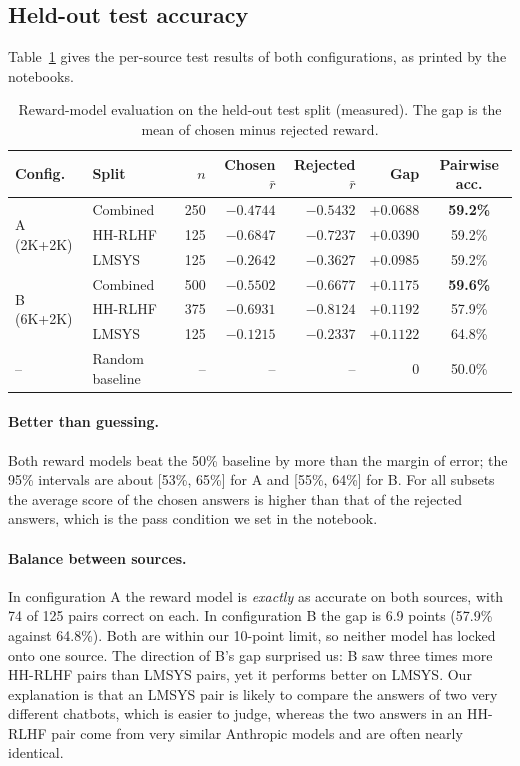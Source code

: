 \subsection{Held-out test accuracy}
Table~\ref{tab:rm-results} gives the per-source test results of both configurations, as printed by the notebooks.

\begin{table}[!htbp]
\centering
\caption[Reward-model test results (A and B)]{Reward-model evaluation on the held-out test split (measured). The gap is the mean of chosen minus rejected reward.}
\label{tab:rm-results}
\small\setlength{\tabcolsep}{4.5pt}
\begin{tabular}{@{}llrrrrc@{}}
\toprule
\textbf{Config.} & \textbf{Split} & \textbf{$n$} & \textbf{Chosen $\bar r$} & \textbf{Rejected $\bar r$} & \textbf{Gap} & \textbf{Pairwise acc.}\\
\midrule
\multirow{3}{*}{A (2K+2K)} & Combined & 250 & $-0.4744$ & $-0.5432$ & $+0.0688$ & \textbf{59.2\%}\\
 & HH-RLHF & 125 & $-0.6847$ & $-0.7237$ & $+0.0390$ & 59.2\%\\
 & LMSYS & 125 & $-0.2642$ & $-0.3627$ & $+0.0985$ & 59.2\%\\
\midrule
\multirow{3}{*}{B (6K+2K)} & Combined & 500 & $-0.5502$ & $-0.6677$ & $+0.1175$ & \textbf{59.6\%}\\
 & HH-RLHF & 375 & $-0.6931$ & $-0.8124$ & $+0.1192$ & 57.9\%\\
 & LMSYS & 125 & $-0.1215$ & $-0.2337$ & $+0.1122$ & 64.8\%\\
\midrule
-- & Random baseline & -- & -- & -- & 0 & 50.0\%\\
\bottomrule
\end{tabular}
\end{table}

\paragraph{Better than guessing.} Both reward models beat the 50\% baseline by more than the margin of error; the 95\% intervals are about [53\%, 65\%] for A and [55\%, 64\%] for B. For all subsets the average score of the chosen answers is higher than that of the rejected answers, which is the pass condition we set in the notebook.

\paragraph{Balance between sources.} In configuration A the reward model is \emph{exactly} as accurate on both sources, with 74 of 125 pairs correct on each. In configuration B the gap is 6.9 points (57.9\% against 64.8\%). Both are within our 10-point limit, so neither model has locked onto one source. The direction of B's gap surprised us: B saw three times more HH-RLHF pairs than LMSYS pairs, yet it performs better on LMSYS. Our explanation is that an LMSYS pair is likely to compare the answers of two very different chatbots, which is easier to judge, whereas the two answers in an HH-RLHF pair come from very similar Anthropic models and are often nearly identical.

